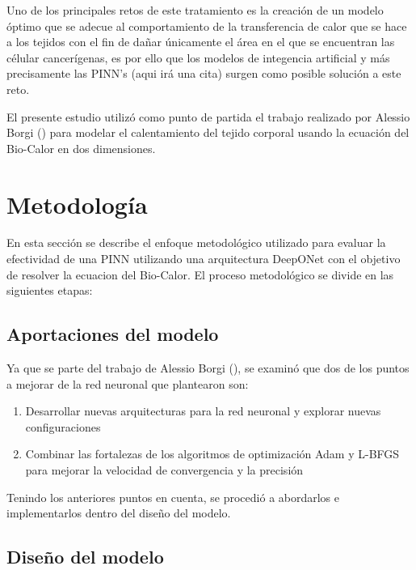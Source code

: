 \documentclass[
  spanish,
  us-letterpaper,
  DIV=11,
  numbers=noendperiod]{scrreprt}
\providecommand{\tightlist}{%
  \setlength{\itemsep}{0pt}\setlength{\parskip}{0pt}}
\theoremstyle{definition}
\theoremstyle{plain}
\theoremstyle{remark}
\begin{document}
Uno de los principales retos de este tratamiento es la creación de un
modelo óptimo que se adecue al comportamiento de la transferencia de
calor que se hace a los tejidos con el fin de dañar únicamente el área
en el que se encuentran las célular cancerígenas, es por ello que los
modelos de integencia artificial y más precisamente las PINN's (aqui irá
una cita) surgen como posible solución a este reto.

El presente estudio utilizó como punto de partida el trabajo realizado
por Alessio Borgi () para modelar el
calentamiento del tejido corporal usando la ecuación del Bio-Calor en
dos dimensiones.

\chapter{Metodología}\label{metodologuxeda}

En esta sección se describe el enfoque metodológico utilizado para
evaluar la efectividad de una PINN utilizando una arquitectura DeepONet
con el objetivo de resolver la ecuacion del Bio-Calor. El proceso
metodológico se divide en las siguientes etapas:

\section{Aportaciones del modelo}\label{aportaciones-del-modelo}

Ya que se parte del trabajo de Alessio Borgi
(), se examinó que dos de los puntos a
mejorar de la red neuronal que plantearon son:

\begin{enumerate}
\def\labelenumi{\arabic{enumi}.}
\tightlist
\item
  Desarrollar nuevas arquitecturas para la red neuronal y explorar
  nuevas configuraciones
\item
  Combinar las fortalezas de los algoritmos de optimización Adam y
  L-BFGS para mejorar la velocidad de convergencia y la precisión
\end{enumerate}

Tenindo los anteriores puntos en cuenta, se procedió a abordarlos e
implementarlos dentro del diseño del modelo.

\section{Diseño del modelo}\label{diseuxf1o-del-modelo}
\end{document}
